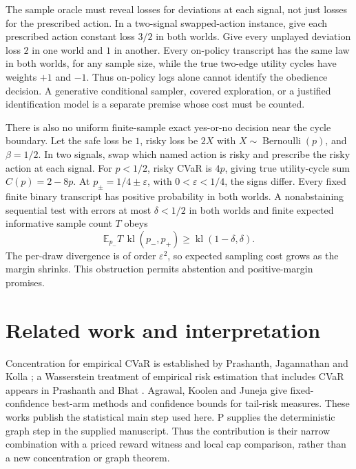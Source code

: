 \documentclass{article}
\begin{document}
The sample oracle must reveal losses for deviations at each signal, not
just losses for the prescribed action. In a two-signal swapped-action
instance, give each prescribed action constant loss \(3/2\) in both
worlds. Give every unplayed deviation loss \(2\) in one world and
\(1\) in another. Every on-policy transcript has the same law in both
worlds, for any sample size, while the true two-edge utility cycles have
weights \(+1\) and \(-1\). Thus on-policy logs alone cannot identify
the obedience decision. A generative conditional sampler, covered
exploration, or a justified identification model is a separate premise
whose cost must be counted.

There is also no uniform finite-sample exact yes-or-no decision near the
cycle boundary. Let the safe loss be \(1\), risky loss be
\(2X\) with \(X\sim\operatorname{Bernoulli}(p)\), and
\(\beta=1/2\). In two signals, swap which named action is risky and
prescribe the risky action at each signal. For \(p<1/2\), risky CVaR is
\(4p\), giving true utility-cycle sum \(C(p)=2-8p\).
At \(p_{\pm}=1/4\pm\varepsilon\), with
\(0<\varepsilon<1/4\), the signs differ. Every fixed finite binary
transcript has positive probability in both worlds. A nonabstaining
sequential test with errors at most \(\delta<1/2\) in both worlds and
finite expected informative sample count \(T\) obeys
\[
\mathbb E_{p_-}T\,
\operatorname{kl}(p_-,p_+)
\geq\operatorname{kl}(1-\delta,\delta).
\]
The per-draw divergence is of order \(\varepsilon^2\), so expected
sampling cost grows as the margin shrinks. This obstruction permits
abstention and positive-margin promises.

\section{Related work and interpretation}\label{sec:related}

Concentration for empirical CVaR is established by
Prashanth, Jagannathan and Kolla \cite{prashanth2019concentration}; a
Wasserstein treatment of empirical risk estimation that includes CVaR
appears in Prashanth and Bhat \cite{prashanth2019wasserstein}.
Agrawal, Koolen and Juneja \cite{agrawal2021tailrisk} give
fixed-confidence best-arm methods and confidence bounds for tail-risk
measures. These works publish the statistical main step used here. P
\cite{pathfinder2026reversal} supplies the deterministic graph step in
the supplied manuscript. Thus the contribution is their narrow
combination with a priced reward witness and local cap comparison, rather
than a new concentration or graph theorem.
\end{document}
